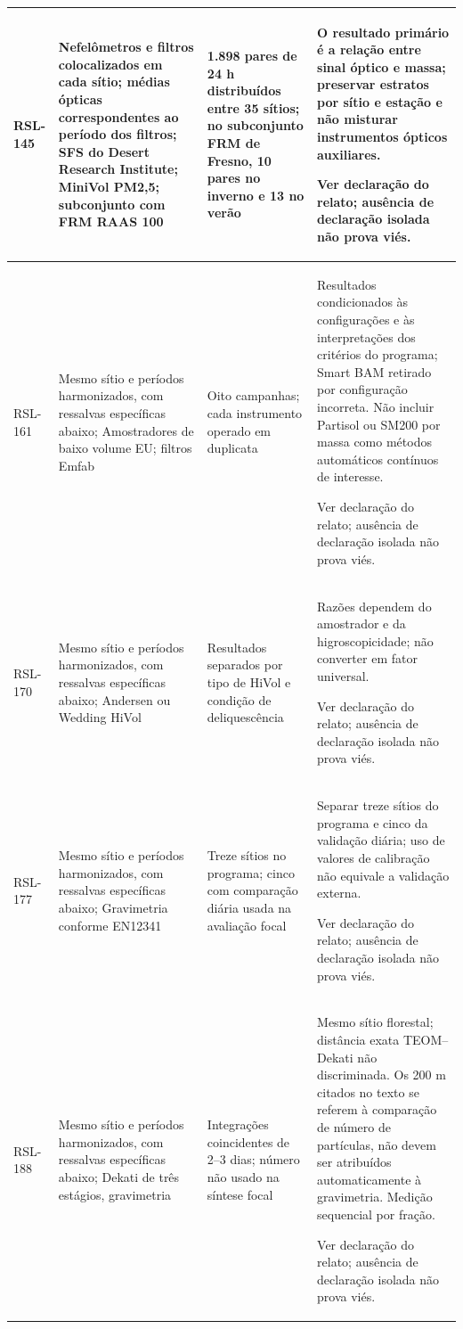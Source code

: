 \begin{longtable}{|P{0.12\textwidth}|P{0.28\textwidth}|P{0.28\textwidth}|P{\arrayrulewidth\relax}|}
RSL-145 & Nefelômetros e filtros colocalizados em cada sítio; médias ópticas correspondentes ao período dos filtros; SFS do Desert Research Institute; MiniVol PM2,5; subconjunto com FRM RAAS 100 & 1.898 pares de 24 h distribuídos entre 35 sítios; no subconjunto FRM de Fresno, 10 pares no inverno e 13 no verão & O resultado primário é a relação entre sinal óptico e massa; preservar estratos por sítio e estação e não misturar instrumentos ópticos auxiliares.\par\medskip Ver declaração do relato; ausência de declaração isolada não prova viés.\\\hline
RSL-161 & Mesmo sítio e períodos harmonizados, com ressalvas específicas abaixo; Amostradores de baixo volume EU; filtros Emfab & Oito campanhas; cada instrumento operado em duplicata & Resultados condicionados às configurações e às interpretações dos critérios do programa; Smart BAM retirado por configuração incorreta. Não incluir Partisol ou SM200 por massa como métodos automáticos contínuos de interesse.\par\medskip Ver declaração do relato; ausência de declaração isolada não prova viés.\\\hline
RSL-170 & Mesmo sítio e períodos harmonizados, com ressalvas específicas abaixo; Andersen ou Wedding HiVol & Resultados separados por tipo de HiVol e condição de deliquescência & Razões dependem do amostrador e da higroscopicidade; não converter em fator universal.\par\medskip Ver declaração do relato; ausência de declaração isolada não prova viés.\\\hline
RSL-177 & Mesmo sítio e períodos harmonizados, com ressalvas específicas abaixo; Gravimetria conforme EN12341 & Treze sítios no programa; cinco com comparação diária usada na avaliação focal & Separar treze sítios do programa e cinco da validação diária; uso de valores de calibração não equivale a validação externa.\par\medskip Ver declaração do relato; ausência de declaração isolada não prova viés.\\\hline
RSL-188 & Mesmo sítio e períodos harmonizados, com ressalvas específicas abaixo; Dekati de três estágios, gravimetria & Integrações coincidentes de 2--3 dias; número não usado na síntese focal & Mesmo sítio florestal; distância exata TEOM--Dekati não discriminada. Os 200 m citados no texto se referem à comparação de número de partículas, não devem ser atribuídos automaticamente à gravimetria. Medição sequencial por fração.\par\medskip Ver declaração do relato; ausência de declaração isolada não prova viés.\\\hline

\end{longtable}
